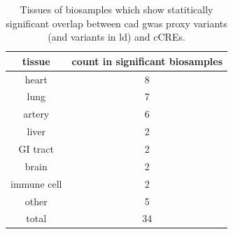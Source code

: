 \begin{table}[h!]
\capstart
\centering
\begin{minipage}{\captionwidth}
    \caption[enriched tissues]{ \newline Tissues of biosamples which show statitically significant overlap between \ac{cad} \ac{gwas} proxy variants (and variants in \ac{ld}) and \acp{cCRE}.}
    \label{tab:enriched_tissues}
\end{minipage}
\begin{tabular}{|c|c|}
    \hline
    tissue      & count in significant biosamples \\ \hline
    heart       & 8                               \\
    lung        & 7                               \\
    artery      & 6                               \\
    liver       & 2                               \\
    GI tract    & 2                               \\
    brain       & 2                               \\
    immune cell & 2                               \\
    other       & 5                               \\ \hline
    total       & 34                              \\ \hline
    \end{tabular}
\end{table}


